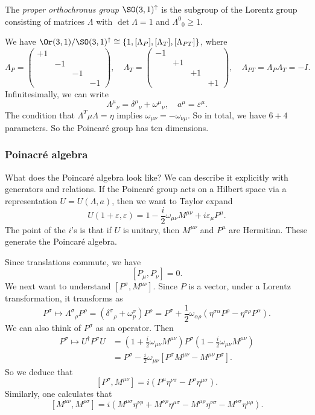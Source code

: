 \documentclass[a4paper]{article}
\begin{document}
\begin{defi}
  The \emph{proper orthochronus group} $\SO(3, 1)^\uparrow$ is the subgroup of the Lorentz group consisting of matrices $\Lambda$ with $\det \Lambda = 1$ and $\Lambda^0\!_0 \geq 1$.
\end{defi}
We have $\Or(3, 1) / \SO(3, 1)^{\uparrow} \cong \{1, [\Lambda_P], [\Lambda_T], [\Lambda_{PT}] \}$, where
\[
  \Lambda_P=
  \begin{pmatrix}
    +1 \\
    & -1\\
    & & -1\\
    & & & -1
  \end{pmatrix},\quad \Lambda_T =
  \begin{pmatrix}
    -1 \\
    & +1\\
    & & +1\\
    & & & +1
  \end{pmatrix},\quad
  \Lambda_{PT} = \Lambda_P \Lambda_T = -I.
\]
Infinitesimally, we can write
\[
  \Lambda^\mu\!_\nu = \delta^\mu\!_\nu + \omega^\mu\!_\nu, \quad a^\mu = \varepsilon^\mu.
\]
The condition that $\Lambda^T \mu \Lambda = \eta$ implies $\omega_{\mu\nu} = -\omega_{\nu\mu}$. So in total, we have $6 + 4$ parameters. So the Poincar\'e group has ten dimensions.

\subsubsection*{Poinacr\'e algebra}
What does the Poincar\'e algebra look like? We can describe it explicitly with generators and relations. If the Poincar\'e group acts on a Hilbert space via a representation $U = U(\Lambda, a)$, then we want to Taylor expand
\[
  U(1 + \varepsilon, \varepsilon) = 1 - \frac{i}{2} \omega_{\mu\nu} M^{\mu\nu} + i \varepsilon_\mu P^\mu.
\]
The point of the $i$'s is that if $U$ is unitary, then $M^{\mu\nu}$ and $P^\mu$ are Hermitian. These generate the Poincar\'e algebra.

Since translations commute, we have
\[
  [P_\mu, P_\nu] = 0.
\]
We next want to understand $[P^\sigma, M^{\mu\nu}]$. Since $P$ is a vector, under a Lorentz transformation, it transforms as
\[
  P^\sigma \mapsto \Lambda^\sigma\!_\rho P^\rho = (\delta^\sigma\!_\rho + \omega^\sigma_p) P^\rho = P^\sigma + \frac{1}{2} \omega_{\alpha \rho} (\eta^{\sigma \alpha} P^\rho - \eta^{\sigma \rho} P^\alpha).
\]
We can also think of $P^\sigma$ as an operator. Then
\begin{align*}
  P^\sigma \mapsto U^\dagger P^\sigma U &= \left(1 + \frac{i}{2} \omega_{\mu\nu} M^{\mu\nu}\right) P^\sigma \left(1 - \frac{i}{2} \omega_{\mu\nu} M^{\mu\nu}\right)\\
  &= P^\sigma - \frac{i}{2} \omega_{\mu\nu} [P^\sigma M^{\mu\nu} - M^{\mu\nu} P^\sigma].
\end{align*}
So we deduce that
\[
  [P^\sigma, M^{\mu\nu}] = i (P^\mu \eta^{\nu \sigma} - P^\nu \eta^{\mu \sigma}).
\]
Similarly, one calculates that
\[
  [M^{\mu\nu}, M^{\rho \sigma}] = i (M^{\mu\sigma} \eta^{\nu \rho} + M^{\nu \rho} \eta^{\mu\sigma} - M^{\mu \rho} \eta^{\nu \sigma} - M^{\nu \sigma} \eta^{\mu \rho}).
\]
\end{document}
